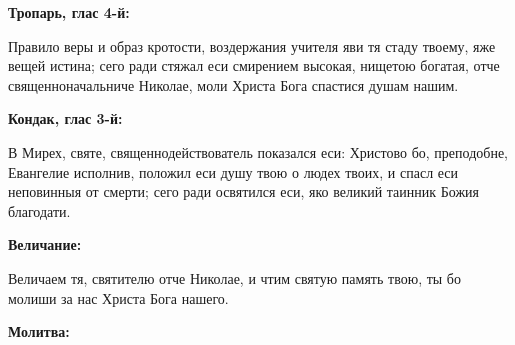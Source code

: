 \bfseries Тропарь, глас 4-й:\normalfont{}


Правило веры и образ кротости, воздержания учителя яви тя стаду твоему, яже вещей истина; сего ради стяжал еси смирением высокая, нищетою богатая, отче священноначальниче Николае, моли Христа Бога спастися душам нашим.


\medskip


\bfseries Кондак, глас 3-й:\normalfont{}


В Мирех, святе, священнодействователь показался еси: Христово бо, преподобне, Евангелие исполнив, положил еси душу твою о людех твоих, и спасл еси неповинныя от смерти; сего ради освятился еси, яко великий таинник Божия благодати.


\medskip


\bfseries Величание:\normalfont{}


Величаем тя, святителю отче Николае, и чтим святую память твою, ты бо молиши за нас Христа Бога нашего.


\medskip


\bfseries Молитва:\normalfont{}


